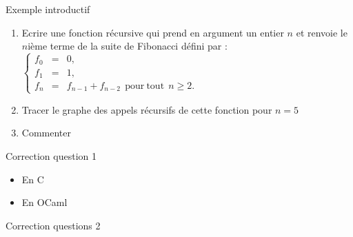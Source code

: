 \documentclass[10pt]{beamer}
\begin{document}
\begin{frame}{\Ctitle}{\stitle}
	\begin{exampleblock}{Exemple introductif}
		\begin{enumerate}
			\item<1-> Ecrire une fonction récursive qui prend en argument un entier $n$ et renvoie le $n$ième terme de la suite de Fibonacci défini par :
				$\left\{ \begin{array}{lll}
						f_0   & = & 0,                                                  \\
						f_1   & = & 1,                                                  \\
						f_{n} & = & f_{n-1}+f_{n-2} \mathrm{\ \ pour\ tout\ \ } n\geq2.\end{array} \right.$
			\item<2-> Tracer le graphe des appels récursifs de cette fonction pour $n=5$
			\item<3-> Commenter
		\end{enumerate}
	\end{exampleblock}
\end{frame}



\begin{frame}{\Ctitle}{\stitle}
	\begin{exampleblock}{Correction question 1}
		\begin{itemize}
			\item <1-> En C
			\item<2-> En OCaml
		\end{itemize}
		
	\end{exampleblock}
\end{frame}

\begin{frame}{\Ctitle}{\stitle}
	\begin{exampleblock}{Correction questions 2}
		\begin{center}
		\end{center}
	\end{exampleblock}
\end{frame}
\end{document}
